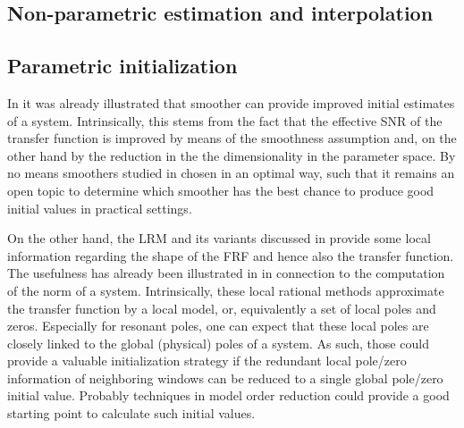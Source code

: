   \subsection{Non-parametric estimation and interpolation}

  \subsection{Parametric initialization}
  In  it was already illustrated that smoother can provide improved initial estimates of a system. 
  Intrinsically, this stems from the fact that the effective \gls{SNR} of the transfer function is improved by means of the smoothness assumption and, on the other hand by the reduction in the the dimensionality in the parameter space.
  By no means smoothers studied in  chosen in an optimal way, such that it remains an open topic to determine which smoother has the best chance to produce good initial values in practical settings.

  On the other hand, the \gls{LRM} and its variants discussed in  provide some local information regarding the shape of the \gls{FRF} and hence also the transfer function.
  The usefulness has already been illustrated in  in connection to the computation of the \Hinf norm of a system.
  Intrinsically, these local rational methods approximate the transfer function by a local model, or, equivalently a set of local poles and zeros.
  Especially for resonant poles, one can expect that these local poles are closely linked to the global (physical) poles of a system.
  As such, those could provide a valuable initialization strategy if the redundant local pole/zero information of neighboring windows can be reduced to a single global pole/zero initial value.
  Probably techniques in model order reduction could provide a good starting point to calculate such initial values.
